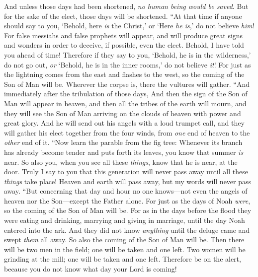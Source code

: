 \begin{biblechapter}
\verse And unless those days had been shortened, \textit{no human being would be saved}. But for the sake of the elect, those days will be shortened.
\verse “At that time if anyone should say to you, ‘Behold, here \textit{is} the Christ,’ or ‘Here \textit{he is},’ do not believe \textit{him}!
\verse For false messiahs and false prophets will appear, and will produce great signs and wonders in order to deceive, if possible, even the elect.
\verse Behold, I have told you ahead of time!
\verse Therefore if they say to you, ‘Behold, he is in the wilderness,’ do not go out, \textit{or} ‘Behold, he is in the inner rooms,’ do not believe \textit{it}!
\verse For just as the lightning comes from the east and flashes to the west, so the coming of the Son of Man will be.
\verse Wherever the corpse is, there the vultures will gather.
 “And immediately after the tribulation of those days,
\verse And then the sign of the Son of Man will appear in heaven, and then all the tribes of the earth will mourn, and they will see the Son of Man arriving on the clouds of heaven with power and great glory.
\verse And he will send out his angels with a loud trumpet call, and they will gather his elect together from the four winds, from \textit{one} end of heaven to the \textit{other} end of it.
 “Now learn the parable from the fig tree: Whenever its branch has already become tender and puts forth its leaves, you know that summer \textit{is} near.
\verse So also you, when you see all these \textit{things}, know that he is near, at the door.
\verse Truly I say to you that this generation will never pass away until all these \textit{things} take place!
\verse Heaven and earth will pass away, but my words will never pass away.
 “But concerning that day and hour no one knows—not even the angels of heaven nor the Son—except the Father alone.
\verse For just as the days of Noah \textit{were}, so the coming of the Son of Man will be.
\verse For as in the days before the flood they were eating and drinking, marrying and giving in marriage, until the day Noah entered into the ark.
\verse And they did not know \textit{anything} until the deluge came and swept \textit{them} all away. So also the coming of the Son of Man will be.
\verse Then there will be two men in the field; one will be taken and one left.
\verse Two women will be grinding at the mill; one will be taken and one left.
\verse Therefore be on the alert, because you do not know what day your Lord is coming!

\end{biblechapter}
